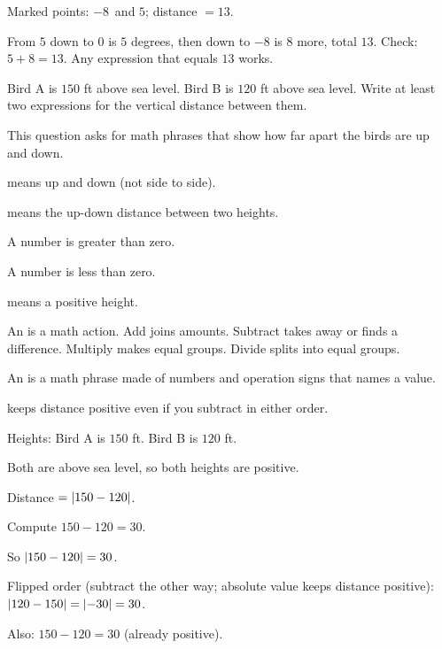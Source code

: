 

\begin{center}
Marked points: $-8$\degF\ and $5$\degF; distance $= 13$.
\end{center}

From $5$ down to $0$ is $5$ degrees, then down to $-8$ is $8$ more, total $13$. Check: $5 + 8 = 13$. Any expression that equals $13$ works.


Bird A is $150$ ft above sea level. Bird B is $120$ ft above sea level. Write at least two expressions for the vertical distance between them.


This question asks for math phrases that show how far apart the birds are up and down.

\begin{words}
  \item {}means up and down (not side to side).
  \item {}means the up-down distance between two heights.
  \item A number is greater than zero.
  \item A number is less than zero.
  \item {}means a positive height.
  \item An is a math action. Add joins amounts. Subtract takes away or finds a difference. Multiply makes equal groups. Divide splits into equal groups.
  \item An is a math phrase made of numbers and operation signs that names a value.
  \item {}keeps distance positive even if you subtract in either order.
\end{words}

\begin{steps}
  \item Heights: Bird A is $150$ ft. Bird B is $120$ ft.
  \item Both are above sea level, so both heights are positive.
  \item Distance $= \left\lvert 150-120 \right\rvert$.
  \item Compute $150 - 120 = 30$.
  \item So $\left\lvert 150-120 \right\rvert = 30$.
  \item Flipped order (subtract the other way; absolute value keeps distance positive): $\left\lvert 120-150 \right\rvert = \left\lvert -30 \right\rvert = 30$.
  \item Also: $150 - 120 = 30$ (already positive).
\end{steps}

